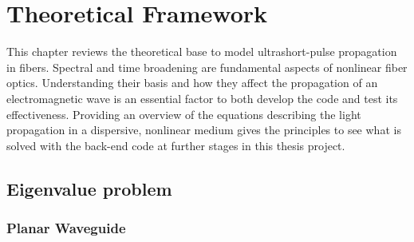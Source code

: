 \chapter{Theoretical Framework}

This chapter reviews the theoretical base to model ultrashort-pulse propagation in fibers. Spectral and time broadening are fundamental aspects of nonlinear fiber optics. Understanding their basis and how they affect the propagation of an electromagnetic wave is an essential factor to both develop the code and test its effectiveness. Providing an overview of the equations describing the light propagation in a dispersive, nonlinear medium gives the principles to see what is solved with the back-end code at further stages in this thesis project.

\section{Eigenvalue problem}

\subsection{Planar Waveguide}



